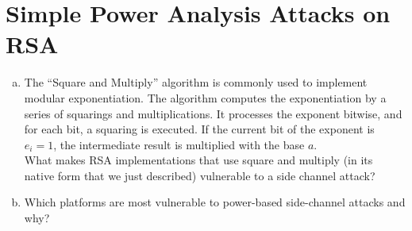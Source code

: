 \documentclass[a4paper,11pt]{article}
\newif\ifsolution\solutionfalse
\newcommand{\includeonlyinsolution}[1]{\ifsolution#1\fi}
\newenvironment{solution}%
{\par{\noindent\small\textit{Solution:}}\vspace{-12pt}\begin{framed}}%
{\end{framed}\par}
\begin{document}
\section{Simple Power Analysis Attacks on RSA}
\begin{enumerate}[(a)]

\item The ``Square and Multiply'' algorithm is commonly used to implement
  modular exponentiation. The algorithm computes the exponentiation by a
  series of squarings and multiplications. It processes the exponent bitwise,
  and for each bit, a squaring is executed. If the current bit of the exponent
  is $e_i=1$, the intermediate result is multiplied with the base $a$. \\
  What makes RSA implementations that use square and multiply (in its native
  form that we just described) vulnerable to a side channel
  attack?
\includeonlyinsolution{\begin{solution}
The vulnerability comes from the key-dependent branching. If bit $k$ of the key
is equal to one, then a multiplication and a modulo operation is done, otherwise,
just an assignment operation. Thus, the execution time depends on the number of
bits of the key.\\
Moreover, we can run the encryption algorithm for a certain key as many times
as we want, with various inputs, and compute the variance of its running time.
We can guess the first $b$ bits of the key and then, using the computed variance,
we can determine if a certain value for bit $b+1$ is correct, if the variance decreases.
\end{solution}}


\item Which platforms are most vulnerable to power-based side-channel attacks and why?
\includeonlyinsolution{\begin{solution}
The most vulnerable platforms for power-based analysis are Smartcards, RFID chips
and Sensor Nodes. This occurs because many of these devices are available for physical access
and because they don't have their own power source, but it is provided by the reader (which can
then measure it). Also, unlike PCs or larger machines, they tend to be application specific: a single
application (in our case the encryption/decryption system) runs of them, so it is easier to obtain
the desired information. This would prove difficult for a PC on which, because of task scheduling
and multiprogramming, many application/processes run.

\end{solution}}
\end{enumerate}
\end{document}
